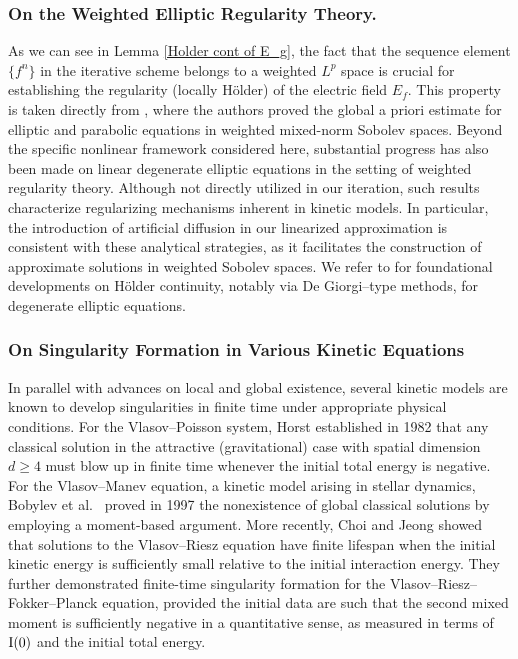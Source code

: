 \documentclass[reqno,11pt,final]{amsart}
\theoremstyle{plain}
\numberwithin{equation}{section}
\numberwithin{theorem}{section}
\begin{document}
\subsubsection{On the Weighted Elliptic Regularity Theory. }As we can see in Lemma \ref{Holder cont of E_g}, the fact that the sequence element $\{f^n\}$ in the iterative scheme belongs to a weighted $L^p$ space is crucial for establishing the regularity (locally H\"older) of the electric field $E_f$. This property is taken directly from \cite{Ell_Dong_2018}, where the authors proved the global a priori estimate for elliptic and parabolic equations in weighted mixed-norm Sobolev spaces.
Beyond the specific nonlinear framework considered here, substantial progress has also been made on linear degenerate elliptic equations in the setting of weighted regularity theory. Although not directly utilized in our iteration, such results characterize regularizing mechanisms inherent in kinetic models. In particular, the introduction of artificial diffusion in our linearized approximation is consistent with these analytical strategies, as it facilitates the construction of approximate solutions in weighted Sobolev spaces. We refer to \cite{Ell_Fabes_1982, Ell_Trudinger_1971, Ell_Balci_2022, Ell_Bella_2021} for foundational developments on Hölder continuity, notably via De Giorgi–type methods, for degenerate elliptic equations.


\subsubsection{On Singularity Formation in Various Kinetic Equations}
In parallel with advances on local and global existence, several kinetic models are known to develop singularities in finite time under appropriate physical conditions. For the Vlasov–Poisson system, Horst \cite{VP_Horst_1982} established in 1982 that any classical solution in the attractive (gravitational) case with spatial dimension 
$d\ge 4$ must blow up in finite time whenever the initial total energy is negative. For the Vlasov–Manev equation, a kinetic model arising in stellar dynamics, Bobylev et al.~\cite{VMV_Bobylev_1997} proved in 1997 the nonexistence of global classical solutions by employing a moment-based argument. More recently, Choi and Jeong \cite{VR_Choi_2024} showed that solutions to the Vlasov–Riesz equation have finite lifespan when the initial kinetic energy is sufficiently small relative to the initial interaction energy. They further demonstrated finite-time singularity formation for the Vlasov–Riesz–Fokker–Planck equation, provided the initial data are such that the second mixed moment is sufficiently negative in a quantitative sense, as measured in terms of $\textup{I}(0)$ and the initial total energy.
\end{document}
